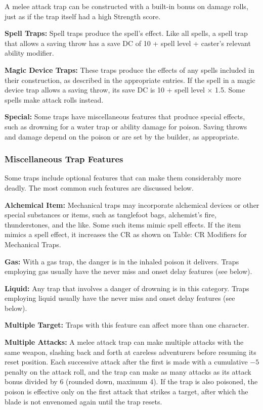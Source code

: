 A melee attack trap can be constructed with a built-in bonus on damage rolls, just as if the trap itself had a high Strength score.

\textbf{Spell Traps:} Spell traps produce the spell's effect. Like all spells, a spell trap that allows a saving throw has a save DC of 10 + spell level + caster's relevant ability modifier.

\textbf{Magic Device Traps:} These traps produce the effects of any spells included in their construction, as described in the appropriate entries. If the spell in a magic device trap allows a saving throw, its save DC is 10 + spell level $\times$ 1.5. Some spells make attack rolls instead.

\textbf{Special:} Some traps have miscellaneous features that produce special effects, such as drowning for a water trap or ability damage for poison. Saving throws and damage depend on the poison or are set by the builder, as appropriate.

\subsubsection{Miscellaneous Trap Features}
Some traps include optional features that can make them considerably more deadly. The most common such features are discussed below.

\textbf{Alchemical Item:} Mechanical traps may incorporate alchemical devices or other special substances or items, such as tanglefoot bags, alchemist's fire, thunderstones, and the like. Some such items mimic spell effects. If the item mimics a spell effect, it increases the CR as shown on Table: CR Modifiers for Mechanical Traps.

\textbf{Gas:} With a gas trap, the danger is in the inhaled poison it delivers. Traps employing gas usually have the never miss and onset delay features (see below).

\textbf{Liquid:} Any trap that involves a danger of drowning is in this category. Traps employing liquid usually have the never miss and onset delay features (see below).

\textbf{Multiple Target:} Traps with this feature can affect more than one character.

\textbf{Multiple Attacks:} A melee attack trap can make multiple attacks with the same weapon, slashing back and forth at careless adventurers before resuming its reset position. Each successive attack after the first is made with a cumulative $-5$ penalty on the attack roll, and the trap can make as many attacks as its attack bonus divided by 6 (rounded down, maximum 4). If the trap is also poisoned, the poison is effective only on the first attack that strikes a target, after which the blade is not envenomed again until the trap resets.


